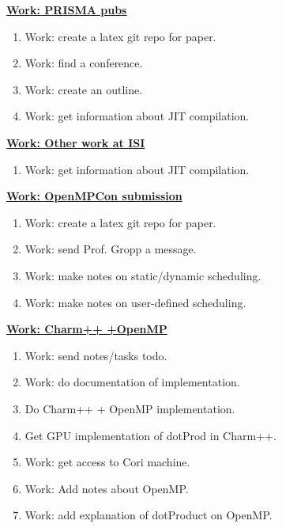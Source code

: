 {\begin{multicols}{4}
\begin{minipage}{\columnwidth}
\underline{\bf \tiny {Work: PRISMA pubs}}
\begin{enumerate}
\tiny \item \tiny Work: create a latex git repo for paper.
\item \tiny Work: find a conference.
\item \tiny Work: create an outline.
\item \tiny Work: get information about JIT compilation.
\end{enumerate}
\end{minipage}

\begin{minipage}{\columnwidth}
\underline{\bf \tiny {Work: Other work at ISI}}
\begin{enumerate}
\item \tiny Work: get information about JIT compilation.
\end{enumerate}
\end{minipage}

\begin{minipage}{\columnwidth}
\underline{\bf \tiny {Work: OpenMPCon submission}}
\begin{enumerate}
\tiny \item \tiny Work: create a latex git repo for paper.
\item \tiny Work: send Prof. Gropp a message.
\item \tiny Work: make notes on static/dynamic scheduling.
\item \tiny Work: make notes on user-defined scheduling.
\end{enumerate}
\end{minipage}

\begin{minipage}{\columnwidth}
\underline{\bf \tiny {Work: Charm++ +OpenMP}}
\begin{enumerate}
\tiny \item \tiny Work: send notes/tasks todo.
\item \tiny Work: do documentation of implementation.
\item \tiny Do Charm++ + OpenMP implementation.
\item \tiny Get GPU implementation of dotProd in Charm++.
\item \tiny Work: get access to Cori machine.
\item \tiny Work: Add notes about OpenMP.
\item \tiny Work: add explanation of dotProduct on OpenMP.
\end{enumerate}
\end{minipage}



\end{multicols}}
